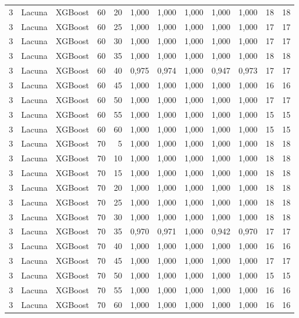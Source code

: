 \begin{longtable}{@{}rllrrrrrrrrr@{}}
3 & Lacuna & XGBoost & 60 & 20 & 1,000 & 1,000 & 1,000 & 1,000 & 1,000 & 18 & 18 \\
3 & Lacuna & XGBoost & 60 & 25 & 1,000 & 1,000 & 1,000 & 1,000 & 1,000 & 17 & 17 \\
3 & Lacuna & XGBoost & 60 & 30 & 1,000 & 1,000 & 1,000 & 1,000 & 1,000 & 17 & 17 \\
3 & Lacuna & XGBoost & 60 & 35 & 1,000 & 1,000 & 1,000 & 1,000 & 1,000 & 18 & 18 \\
3 & Lacuna & XGBoost & 60 & 40 & 0,975 & 0,974 & 1,000 & 0,947 & 0,973 & 17 & 17 \\
3 & Lacuna & XGBoost & 60 & 45 & 1,000 & 1,000 & 1,000 & 1,000 & 1,000 & 16 & 16 \\
3 & Lacuna & XGBoost & 60 & 50 & 1,000 & 1,000 & 1,000 & 1,000 & 1,000 & 17 & 17 \\
3 & Lacuna & XGBoost & 60 & 55 & 1,000 & 1,000 & 1,000 & 1,000 & 1,000 & 15 & 15 \\
3 & Lacuna & XGBoost & 60 & 60 & 1,000 & 1,000 & 1,000 & 1,000 & 1,000 & 15 & 15 \\
3 & Lacuna & XGBoost & 70 & 5 & 1,000 & 1,000 & 1,000 & 1,000 & 1,000 & 18 & 18 \\
3 & Lacuna & XGBoost & 70 & 10 & 1,000 & 1,000 & 1,000 & 1,000 & 1,000 & 18 & 18 \\
3 & Lacuna & XGBoost & 70 & 15 & 1,000 & 1,000 & 1,000 & 1,000 & 1,000 & 18 & 18 \\
3 & Lacuna & XGBoost & 70 & 20 & 1,000 & 1,000 & 1,000 & 1,000 & 1,000 & 18 & 18 \\
3 & Lacuna & XGBoost & 70 & 25 & 1,000 & 1,000 & 1,000 & 1,000 & 1,000 & 18 & 18 \\
3 & Lacuna & XGBoost & 70 & 30 & 1,000 & 1,000 & 1,000 & 1,000 & 1,000 & 18 & 18 \\
3 & Lacuna & XGBoost & 70 & 35 & 0,970 & 0,971 & 1,000 & 0,942 & 0,970 & 17 & 17 \\
3 & Lacuna & XGBoost & 70 & 40 & 1,000 & 1,000 & 1,000 & 1,000 & 1,000 & 16 & 16 \\
3 & Lacuna & XGBoost & 70 & 45 & 1,000 & 1,000 & 1,000 & 1,000 & 1,000 & 17 & 17 \\
3 & Lacuna & XGBoost & 70 & 50 & 1,000 & 1,000 & 1,000 & 1,000 & 1,000 & 15 & 15 \\
3 & Lacuna & XGBoost & 70 & 55 & 1,000 & 1,000 & 1,000 & 1,000 & 1,000 & 16 & 16 \\
3 & Lacuna & XGBoost & 70 & 60 & 1,000 & 1,000 & 1,000 & 1,000 & 1,000 & 16 & 16 \\

\end{longtable}
